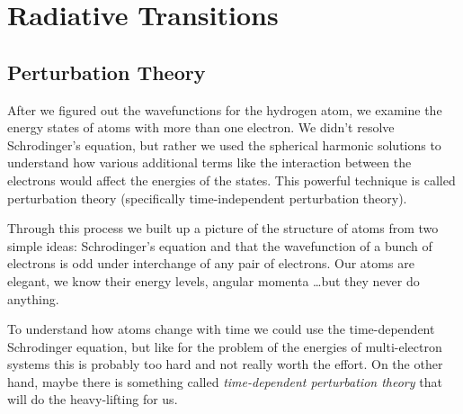\chapter{Radiative Transitions}
\label{cha:radi-trans}
\section{Perturbation Theory}
\label{sec:perturbation-theory}

After we figured out the wavefunctions for the hydrogen atom, we
examine the energy states of atoms with more than one electron.  We
didn't resolve Schrodinger's equation, but rather we used the
spherical harmonic solutions to understand how various additional
terms like the interaction between the electrons would affect the
energies of the states.  This powerful technique is called
perturbation theory (specifically time-independent perturbation
theory).  

Through this process we built up a picture of the structure of atoms
from two simple ideas: Schrodinger's equation and that the
wavefunction of a bunch of electrons is odd under interchange of any
pair of electrons.   Our atoms are elegant, we know their energy
levels, angular momenta \ldots but they never do anything.

To understand how atoms change with time we could use the
time-dependent Schrodinger equation, but like for the problem of the
energies of multi-electron systems this is probably too hard and not
really worth the effort.  On the other hand, maybe there is something
called {\em time-dependent perturbation theory} that will do the
heavy-lifting for us.

